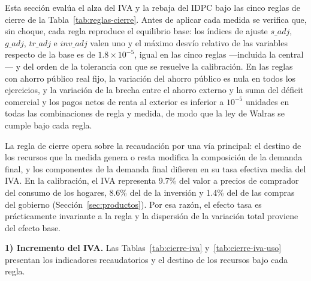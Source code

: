 \documentclass[11pt]{article}
\begin{document}
Esta sección evalúa el alza del IVA y la rebaja del IDPC bajo las cinco reglas de cierre de la Tabla~\ref{tab:reglas-cierre}. Antes de aplicar cada medida se verifica que, sin choque, cada regla reproduce el equilibrio base: los índices de ajuste $s\_adj$, $g\_adj$, $tr\_adj$ e $inv\_adj$ valen uno y el máximo desvío relativo de las variables respecto de la base es de $1.8\times10^{-5}$, igual en las cinco reglas ---incluida la central--- y del orden de la tolerancia con que se resuelve la calibración. En las reglas con ahorro público real fijo, la variación del ahorro público es nula en todos los ejercicios, y la variación de la brecha entre el ahorro externo y la suma del déficit comercial y los pagos netos de renta al exterior es inferior a $10^{-5}$ unidades en todas las combinaciones de regla y medida, de modo que la ley de Walras se cumple bajo cada regla.

La regla de cierre opera sobre la recaudación por una vía principal: el destino de los recursos que la medida genera o resta modifica la composición de la demanda final, y los componentes de la demanda final difieren en su tasa efectiva media del IVA. En la calibración, el IVA representa 9.7\% del valor a precios de comprador del consumo de los hogares, 8.6\% del de la inversión y 1.4\% del de las compras del gobierno (Sección~\ref{sec:productos}). Por esa razón, el efecto tasa es prácticamente invariante a la regla y la dispersión de la variación total proviene del efecto base.

\textbf{1) Incremento del IVA.} Las Tablas~\ref{tab:cierre-iva} y~\ref{tab:cierre-iva-uso} presentan los indicadores recaudatorios y el destino de los recursos bajo cada regla.
\end{document}
